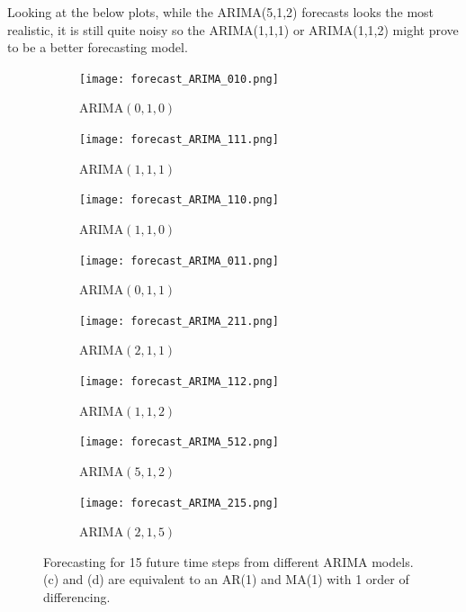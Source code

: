\documentclass{article}
\begin{document}
  Looking at the below plots, while the ARIMA(5,1,2) forecasts looks the most realistic, it is still quite noisy so the ARIMA(1,1,1) or ARIMA(1,1,2) might prove to be a better forecasting model.

  \begin{figure}[H]
    \centering
    \captionsetup{justification=centering}
    \begin{subfigure}[b]{0.49\linewidth}
      \texttt{[image: forecast\_ARIMA\_010.png]}
      \caption{ARIMA$(0, 1, 0)$}
    \end{subfigure}
    \begin{subfigure}[b]{0.49\linewidth}
      \texttt{[image: forecast\_ARIMA\_111.png]}
      \caption{ARIMA$(1, 1, 1)$}
    \end{subfigure}
    \begin{subfigure}[b]{0.49\linewidth}
      \texttt{[image: forecast\_ARIMA\_110.png]}
      \caption{ARIMA$(1, 1, 0)$}
    \end{subfigure}
    \begin{subfigure}[b]{0.49\linewidth}
      \texttt{[image: forecast\_ARIMA\_011.png]}
      \caption{ARIMA$(0, 1, 1)$}
    \end{subfigure}
    \begin{subfigure}[b]{0.49\linewidth}
      \texttt{[image: forecast\_ARIMA\_211.png]}
      \caption{ARIMA$(2, 1, 1)$}
    \end{subfigure}
    \begin{subfigure}[b]{0.49\linewidth}
      \texttt{[image: forecast\_ARIMA\_112.png]}
      \caption{ARIMA$(1, 1, 2)$}
    \end{subfigure}
    \begin{subfigure}[b]{0.49\linewidth}
      \texttt{[image: forecast\_ARIMA\_512.png]}
      \caption{ARIMA$(5, 1, 2)$}
    \end{subfigure}
    \begin{subfigure}[b]{0.49\linewidth}
      \texttt{[image: forecast\_ARIMA\_215.png]}
      \caption{ARIMA$(2, 1, 5)$}
    \end{subfigure}
    \caption{Forecasting for 15 future time steps from different ARIMA models. (c) and (d) are equivalent to an AR(1) and MA(1) with 1 order of differencing.}
  \end{figure}
  
  \newpage
\end{document}

